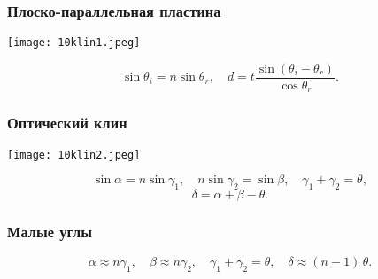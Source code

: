 \documentclass[12pt, a4paper]{article}
\begin{document}
\subsubsection*{Плоско-параллельная пластина}
\begin{center}
\texttt{[image: 10klin1.jpeg]}
\end{center}

\[
\sin \theta_i = n \sin \theta_r,
\quad
d = t \frac{\sin(\theta_i - \theta_r)}{\cos \theta_r}.
\]

\subsubsection*{Оптический клин}

\begin{center}
\texttt{[image: 10klin2.jpeg]}
\end{center}

\[
\sin \alpha = n \sin \gamma_1, \quad n \sin \gamma_2 = \sin \beta, \quad \gamma_1 + \gamma_2 = \theta,
\]
\[
\delta = \alpha + \beta - \theta.
\]

\subsubsection*{Малые углы}

\[
\alpha \approx n \gamma_1, \quad \beta \approx n \gamma_2, \quad \gamma_1 + \gamma_2 = \theta,
\quad
\delta \approx (n - 1)\,\theta.
\]
\end{document}
